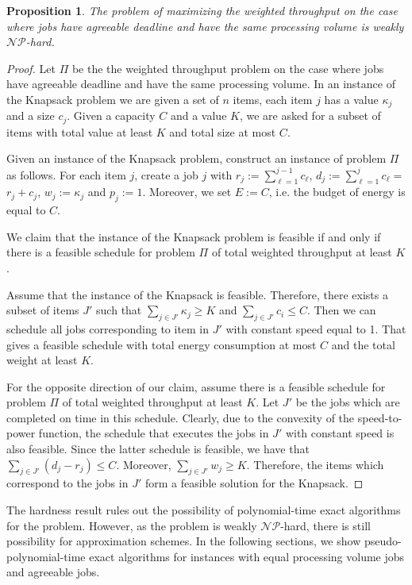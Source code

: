 \documentclass[11pt,a4paper]{article}
\newtheorem{prop}{Proposition}
\begin{document}
\begin{prop}	\label{prop_np_hard}
The problem of maximizing the weighted throughput on the case where jobs have agreeable deadline and have the same processing volume is weakly $\mathcal{NP}$-hard.
\end{prop}
\begin{proof}
Let $\Pi$ be the the weighted throughput problem on the case where jobs have agreeable deadline and have the same processing volume.
In an instance of the {\sc Knapsack} problem we are given a set of $n$ items, 
each item $j$ has a value $\kappa_j$ and a size $c_j$.
Given a capacity $C$ and a value $K$, we are asked for a subset of items with total 
value at least $K$ and total size at most $C$.


Given an instance of the {\sc Knapsack} problem, 
construct an instance of problem $\Pi$ as follows.
For each item $j$, create a job $j$ with 
$r_j:=\sum_{\ell=1}^{j-1} c_\ell$, $d_j  := \sum_{\ell=1}^{j}c_\ell = $ $r_{j} + c_{j}$, $w_j:=\kappa_j$ and $p_j:=1$.
Moreover, we set $E:=C$, i.e. the budget of energy is equal to $C$.

We claim that the instance of the {\sc Knapsack} problem is feasible 
if and only if there is a feasible schedule for problem $\Pi$
of total weighted throughput at least $K$.

Assume that the instance of the {\sc Knapsack} is feasible.
Therefore, there exists  a subset of items $J'$ such that $\sum_{j\in J'}\kappa_j\geq K$ and $\sum_{j\in J'}c_i\leq C$.
Then we can schedule all jobs corresponding to item in $J'$ 
with constant speed equal to 1. That gives a feasible schedule
with total energy consumption at most $C$ and the total weight at least $K$. 

For the opposite direction of our claim, assume there is a feasible schedule for
problem $\Pi$ of total weighted throughput at least $K$.
Let $J'$ be the jobs which are completed on time in this schedule.
Clearly, due to the convexity of the speed-to-power function, the schedule that 
executes the jobs in $J'$ with constant speed is also feasible.
Since the latter schedule is feasible, we have that $\sum_{j\in J'}(d_j-r_j)\leq C$.
Moreover, $\sum_{j\in J'}w_j\geq K$.
Therefore, the items which correspond to the jobs in $J'$ form a feasible solution for the {\sc Knapsack}. 
\end{proof}

The hardness result rules out the possibility of polynomial-time exact algorithms for the problem. 
However, as the problem is weakly $\mathcal{NP}$-hard, there is still possibility for approximation schemes. 
In the following sections, we show pseudo-polynomial-time exact algorithms for instances with 
equal processing volume jobs 
and agreeable jobs.  
\end{document}
